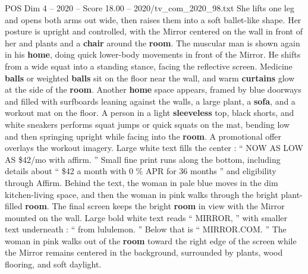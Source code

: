 \begin{textsample}{POS Dim 4 – 2020 – Score 18.00 – 2020/tv\_com\_2020\_98.txt}
She lifts one leg and opens both arms out wide, then raises them into a soft ballet-like shape.
Her posture is upright and controlled, with the Mirror centered on the wall in front of her and plants and a \textbf{chair} around the \textbf{room}.
The muscular man is shown again in his \textbf{home}, doing quick lower-body movements in front of the Mirror.
He shifts from a wide squat into a standing stance, facing the reflective screen.
Medicine \textbf{balls} or weighted \textbf{balls} sit on the floor near the wall, and warm \textbf{curtains} glow at the side of the \textbf{room}.
Another \textbf{home} space appears, framed by blue doorways and filled with surfboards leaning against the walls, a large plant, a \textbf{sofa}, and a workout mat on the floor.
A person in a light \textbf{sleeveless} top, black shorts, and white sneakers performs squat jumps or quick squats on the mat, bending low and then springing upright while facing into the \textbf{room}.
A promotional offer overlays the workout imagery.
Large white text fills the center : “ NOW AS LOW AS \$42/mo with affirm. ” Small fine print runs along the bottom, including details about “ \$42 a month with 0 \% APR for 36 months ” and eligibility through Affirm.
Behind the text, the woman in pale blue moves in the dim kitchen-living space, and then the woman in pink walks through the bright plant-filled \textbf{room}.
The final screen keeps the bright \textbf{room} in view with the Mirror mounted on the wall.
Large bold white text reads “ MIRROR, ” with smaller text underneath : “ from lululemon. ” Below that is “ MIRROR.COM. ” The woman in pink walks out of the \textbf{room} toward the right edge of the screen while the Mirror remains centered in the background, surrounded by plants, wood flooring, and soft daylight.

\end{textsample}
